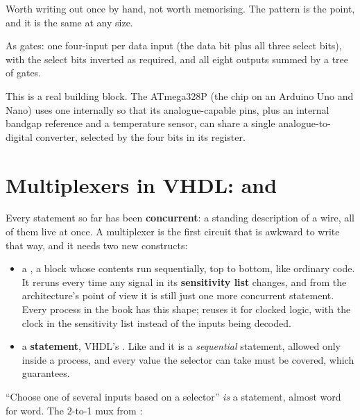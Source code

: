 Worth writing out once by hand, not worth memorising. The pattern is the point, and it is the same
at any size.

As gates: one four-input  per data input (the data bit plus all three select bits), with
the select bits inverted as required, and all eight  outputs summed by a tree of
 gates.


This is a real building block. The ATmega328P (the chip on an Arduino Uno and Nano) uses one
internally so that its analogue-capable pins, plus an internal bandgap reference and a temperature
sensor, can share a single analogue-to-digital converter, selected by the four  bits in
its  register.

\section{Multiplexers in VHDL:  and }
\label{c2:sec:process}

Every statement so far has been \textbf{concurrent}: a standing description of a wire, all of them
live at once. A multiplexer is the first circuit that is awkward to write that way, and it needs
two new constructs:
\begin{itemize}
  \item a \textbf{}, a block whose contents run sequentially, top to bottom, like
    ordinary code. It reruns every time any signal in its \textbf{sensitivity list} changes, and
    from the architecture's point of view it is still just one more concurrent statement. Every
    process in the book has this shape;  reuses it for clocked logic, with the clock
    in the sensitivity list instead of the inputs being decoded.
  \item a \textbf{ statement}, VHDL's . Like  and  it is
    a \emph{sequential} statement, allowed only inside a process, and every value the selector can
    take must be covered, which  guarantees.
\end{itemize}

``Choose one of several inputs based on a selector'' \emph{is} a  statement, almost word
for word. The 2-to-1 mux from :

